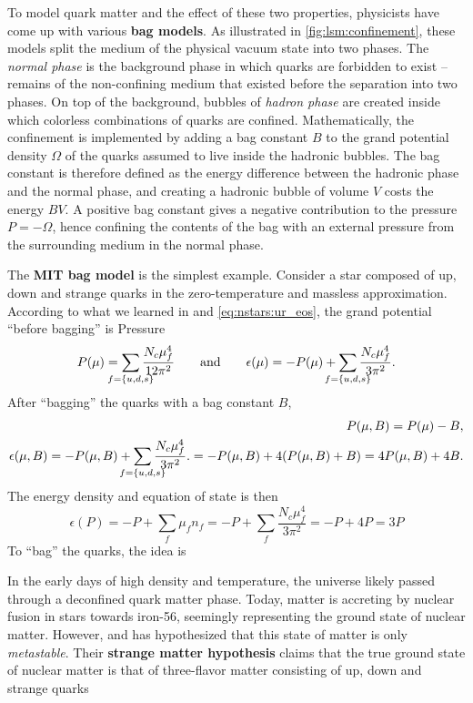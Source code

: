 To model quark matter and the effect of these two properties,
physicists have come up with various \textbf{bag models}.
As illustrated in \cref{fig:lsm:confinement}, these models split the medium of the physical vacuum state into two phases.
The \emph{normal phase} is the background phase in which quarks are forbidden to exist -- remains of the non-confining medium that existed before the separation into two phases.
On top of the background, bubbles of \emph{hadron phase} are created inside which colorless combinations of quarks are confined.
Mathematically, the confinement is implemented by adding a bag constant $B$ to the grand potential density $\Omega$ of the quarks assumed to live inside the hadronic bubbles.
The bag constant is therefore defined as the energy difference between the hadronic phase and the normal phase,
and creating a hadronic bubble of volume $V$ costs the energy $B V$.
A positive bag constant gives a negative contribution to the pressure $P = -\Omega$,
hence confining the contents of the bag with an external pressure from the surrounding medium in the normal phase.

The \textbf{MIT bag model} is the simplest example.
Consider a star composed of up, down and strange quarks in the zero-temperature and massless approximation.
According to what we learned in  and \eqref{eq:nstars:ur_eos}, the grand potential ``before bagging'' is
Pressure
\begin{equation}
	P(\mu) = \smashoperator{\sum_{f=\{u,d,s\}}} \frac{N_c \mu_f^4}{12 \pi^2}
	\qquad \text{and} \qquad
	\epsilon(\mu) = -P(\mu) + \smashoperator{\sum_{f=\{u,d,s\}}} \frac{N_c \mu_f^4}{3 \pi^2}.
\end{equation}
After ``bagging'' the quarks with a bag constant $B$,
\begin{equation}
\begin{split}
	P(\mu,B) = P(\mu) - B, \\
	\epsilon(\mu,B) = -P(\mu,B) + \smashoperator{\sum_{f=\{u,d,s\}}} \frac{N_c \mu_f^4}{3 \pi^2}.
	                = -P(\mu,B) + 4 (P(\mu,B) + B) = 4 P(\mu,B) + 4 B.
\end{split}
\end{equation}
The energy density and equation of state is then
\begin{equation}
	\epsilon(P) = -P + \sum_f \mu_f n_f = -P + \sum_f \frac{N_c \mu_f^4}{3 \pi^2} = -P + 4P = 3P
\end{equation}
To ``bag'' the quarks, the idea is 

In the early days of high density and temperature, the universe likely passed through a deconfined quark matter phase.
Today, matter is accreting by nuclear fusion in stars towards iron-56, seemingly representing the ground state of nuclear matter.
However, \cite{ref:strange_hypothesis_bodmer} and \cite{ref:strange_hypothesis_witten} has hypothesized that this state of matter is only \emph{metastable}.
Their \textbf{strange matter hypothesis} claims that the true ground state of nuclear matter is that of three-flavor matter consisting of up, down and strange quarks

